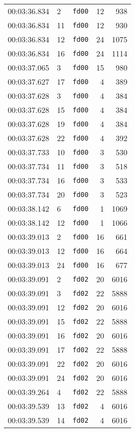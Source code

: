 \documentclass{article}
\begin{document}
\begin{longtable}{lllrr}
00:03:36.834 & 2 & \texttt{fd00} & 12 & 938 \\
00:03:36.834 & 11 & \texttt{fd00} & 12 & 930 \\
00:03:36.834 & 12 & \texttt{fd00} & 24 & 1075 \\
00:03:36.834 & 16 & \texttt{fd00} & 24 & 1114 \\
00:03:37.065 & 3 & \texttt{fd00} & 15 & 980 \\
00:03:37.627 & 17 & \texttt{fd00} & 4 & 389 \\
00:03:37.628 & 3 & \texttt{fd00} & 4 & 384 \\
00:03:37.628 & 15 & \texttt{fd00} & 4 & 384 \\
00:03:37.628 & 19 & \texttt{fd00} & 4 & 384 \\
00:03:37.628 & 22 & \texttt{fd00} & 4 & 392 \\
00:03:37.733 & 10 & \texttt{fd00} & 3 & 530 \\
00:03:37.734 & 11 & \texttt{fd00} & 3 & 518 \\
00:03:37.734 & 16 & \texttt{fd00} & 3 & 533 \\
00:03:37.734 & 20 & \texttt{fd00} & 3 & 523 \\
00:03:38.142 & 6 & \texttt{fd00} & 1 & 1069 \\
00:03:38.142 & 12 & \texttt{fd00} & 1 & 1066 \\
00:03:39.013 & 2 & \texttt{fd00} & 16 & 661 \\
00:03:39.013 & 12 & \texttt{fd00} & 16 & 664 \\
00:03:39.013 & 24 & \texttt{fd00} & 16 & 677 \\
00:03:39.091 & 2 & \texttt{fd02} & 20 & 6016 \\
00:03:39.091 & 3 & \texttt{fd02} & 22 & 5888 \\
00:03:39.091 & 12 & \texttt{fd02} & 20 & 6016 \\
00:03:39.091 & 15 & \texttt{fd02} & 22 & 5888 \\
00:03:39.091 & 16 & \texttt{fd02} & 20 & 6016 \\
00:03:39.091 & 17 & \texttt{fd02} & 22 & 5888 \\
00:03:39.091 & 22 & \texttt{fd02} & 20 & 6016 \\
00:03:39.091 & 24 & \texttt{fd02} & 20 & 6016 \\
00:03:39.264 & 4 & \texttt{fd02} & 22 & 5888 \\
00:03:39.539 & 13 & \texttt{fd02} & 4 & 6016 \\
00:03:39.539 & 14 & \texttt{fd02} & 4 & 6016 \\

\end{longtable}
\end{document}
